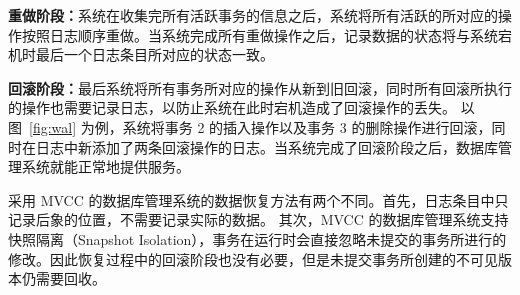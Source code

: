 \textbf{重做阶段：}系统在收集完所有活跃事务的信息之后，系统将所有活跃的所对应的操作按照日志顺序重做。当系统完成所有重做操作之后，记录数据的状态将与系统宕机时最后一个日志条目所对应的状态一致。

\textbf{回滚阶段：}最后系统将所有事务所对应的操作从新到旧回滚，同时所有回滚所执行的操作也需要记录日志，以防止系统在此时宕机造成了回滚操作的丢失。
以图~\ref{fig:wal} 为例，系统将事务 2 的插入操作以及事务 3 的删除操作进行回滚，同时在日志中新添加了两条回滚操作的日志。当系统完成了回滚阶段之后，数据库管理系统就能正常地提供服务。

采用 MVCC 的数据库管理系统的数据恢复方法有两个不同。首先，日志条目中只记录后象的位置，不需要记录实际的数据。
其次，MVCC 的数据库管理系统支持快照隔离（Snapshot Isolation），事务在运行时会直接忽略未提交的事务所进行的修改。因此恢复过程中的回滚阶段也没有必要，但是未提交事务所创建的不可见版本仍需要回收。






